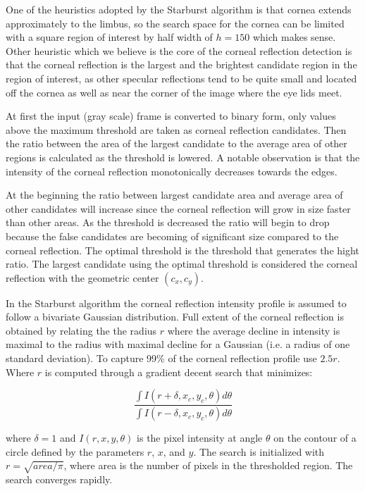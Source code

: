 \documentclass[12pt,fleqn]{book} %
\begin{document}
One of the heuristics adopted by the Starburst algorithm is that cornea extends approximately to the limbus, so the search space for the cornea can be limited with a square region of interest by half width of $h = 150$ which makes sense. Other heuristic which we believe is the core of the corneal reflection detection is that the corneal reflection is the largest and the brightest candidate region in the region of interest, as other specular reflections tend to be quite small and located off the cornea as well as near the corner of the image where the eye lids meet. \bigskip

At first the input (gray scale) frame is converted to binary form, only values above the maximum threshold are taken as corneal reflection candidates. Then the ratio between the area of the largest candidate to the average area of other regions is calculated as the threshold is lowered. A notable observation is that the intensity of the corneal reflection monotonically decreases towards the edges.\bigskip

At the beginning the ratio between  largest candidate area and average area of other candidates will increase since the corneal reflection will grow in size faster than other areas. As the threshold is decreased the ratio will begin to drop because the false candidates are becoming of significant size compared to the corneal reflection. The optimal threshold is the threshold that generates the hight ratio. The largest candidate using the optimal threshold is considered the corneal reflection with the geometric center $(c_{x}, c_{y})$. \bigskip

In the Starburst algorithm the corneal reflection intensity profile is assumed to follow a bivariate Gaussian distribution. Full extent of the corneal reflection is obtained by relating the the radius $r$ where the average decline in intensity is maximal to the radius with maximal decline for a Gaussian (i.e. a radius of one standard deviation). To capture 99\% of the corneal reflection profile use $2.5r$. Where $r$ is computed through a gradient decent search that minimizes:


\begin{dBox}
	\begin{equation}
		\frac{ \int I ( r + \delta, x_{c}, y_{c}, \theta ) d\theta }{ \int I ( r - \delta, x_{c}, y_{c}, \theta ) d\theta}
	\end{equation}
\end{dBox}

where $\delta = 1$ and $I(r, x, y, \theta)$ is the pixel intensity at angle $\theta$ on the contour of a circle defined by the parameters $r$, $x$, and $y$. The search is initialized with $r = \sqrt{area/\pi}$, where area is the number of pixels in the thresholded region. The search converges rapidly.\bigskip
\end{document}
